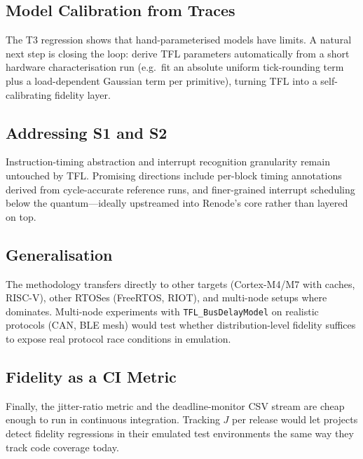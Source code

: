 \subsection{Model Calibration from Traces}
\label{sec:future:calibration}

The T3 regression shows that hand-parameterised models have limits. A
natural next step is closing the loop: derive TFL parameters
automatically from a short hardware characterisation run (e.g.\ fit an
absolute uniform tick-rounding term plus a load-dependent Gaussian
term per primitive), turning TFL into a self-calibrating fidelity
layer.

\subsection{Addressing S1 and S2}
\label{sec:future:s1s2}

Instruction-timing abstraction and interrupt recognition granularity
remain untouched by TFL. Promising directions include per-block timing
annotations derived from cycle-accurate reference runs, and
finer-grained interrupt scheduling below the quantum---ideally
upstreamed into Renode's core rather than layered on top.

\subsection{Generalisation}
\label{sec:future:generalisation}

The methodology transfers directly to other targets (Cortex-M4/M7 with
caches, RISC-V), other RTOSes (FreeRTOS, RIOT), and multi-node setups
where  dominates. Multi-node experiments with
\texttt{TFL\_BusDelayModel} on realistic protocols (CAN, BLE mesh)
would test whether distribution-level fidelity suffices to expose real
protocol race conditions in emulation.

\subsection{Fidelity as a CI Metric}
\label{sec:future:ci}

Finally, the jitter-ratio metric and the deadline-monitor CSV stream
are cheap enough to run in continuous integration. Tracking $J$ per
release would let projects detect fidelity regressions in their
emulated test environments the same way they track code coverage
today.
